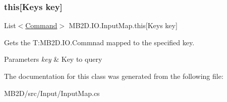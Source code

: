 \subsubsection{\texorpdfstring{this[Keys key]}{this[Keys key]}}
{\footnotesize\ttfamily List$<$\hyperlink{class_m_b2_d_1_1_i_o_1_1_command}{Command}$>$ M\+B2\+D.\+I\+O.\+Input\+Map.\+this\mbox{[}Keys key\mbox{]}\hspace{0.3cm}{\ttfamily [get]}}



Gets the T\+:\+M\+B2\+D.\+I\+O.\+Commnad mapped to the specified key. 


\begin{DoxyParams}{Parameters}
{\em key} & Key to query\\
\hline
\end{DoxyParams}


The documentation for this class was generated from the following file\+:\begin{DoxyCompactItemize}
\item 
M\+B2\+D/src/\+Input/Input\+Map.\+cs\end{DoxyCompactItemize}
